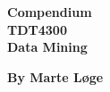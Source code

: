 \begin{titlepage}
\begin{center}

{\Huge \bf Compendium} \\[1.0cm]
{\Huge \bf TDT4300} \\[1.0cm]
{\Large \bf Data Mining} \\[1.0cm]
\vspace{1cm}

{\bf By Marte Løge}


\end{center}
\end{titlepage}